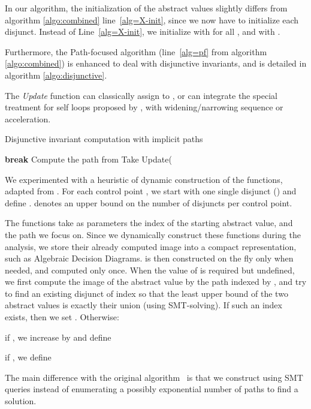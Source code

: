 In our algorithm, the initialization of the abstract values slightly differs from
algorithm \ref{algo:combined} line~\ref{alg=X-init}, since we now have to
initialize each disjunct. Instead of Line~\ref{alg=X-init}, we initialize  with  for all
, and  with
.



Furthermore, the Path-focused algorithm (line~\ref{alg=pf} from algorithm
\ref{algo:combined}) is enhanced to deal with disjunctive invariants, and
is detailed in algorithm \ref{algo:disjunctive}.

The \emph{Update} function can classically assign   to , or can integrate the special treatment for self loops
proposed by \cite{Monniaux_Gonnord_SAS11}, with widening/narrowing sequence or
acceleration.

\begin{algorithm}[!htb]
\caption{Disjunctive invariant computation with implicit paths}\label{gulwani2}
\label{algo:disjunctive}
\begin{algorithmic}[1] 
	\STATE 
	\IF {}
		\STATE \textbf{break}
	\ENDIF
	\STATE Compute the path  from  
	\STATE Take  
	\STATE Update(
\ENDWHILE
\end{algorithmic}
\end{algorithm}

We experimented with a heuristic
of dynamic construction of the  functions, adapted from
\cite{DBLP:conf/pldi/GulwaniZ10}. 
For each control point , we start with one single disjunct
() and define .
 denotes an upper bound on the number of disjuncts per control point.

The  functions take as parameters the index of the starting abstract
value, and the path we focus on. 
Since we dynamically construct these functions
during the analysis, we store their already computed image into a
compact representation, such as Algebraic Decision Diagrams.
 is then constructed on the fly only when needed, and computed
only once.
When the value of  is required but undefined, we first compute
the image of the
abstract value  by the path indexed by , and try to find an existing
disjunct of index  so that the least upper bound of the two abstract values is exactly their union (using SMT-solving).
If such an index exists, then we set .
Otherwise:
\begin{compactitem}
	\item if , we increase  by  and define 
	\item if , we define  
\end{compactitem}
The main difference with the original
algorithm~\cite{DBLP:conf/pldi/GulwaniZ10} is that we construct
 using SMT queries instead of enumerating a possibly
exponential number of paths to find a solution.

